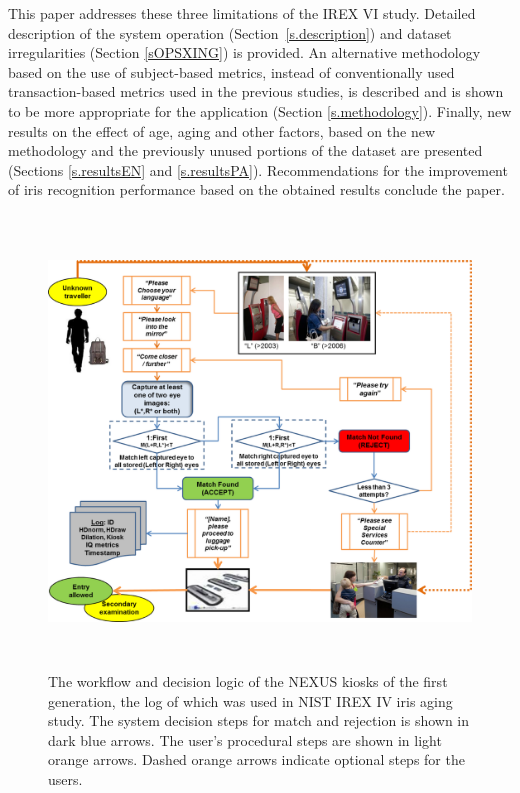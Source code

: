 \documentclass{cta-author}%
\begin{document}
This paper addresses these three limitations of the IREX VI study. 
Detailed description of the system operation (Section~\ref{s.description})
and dataset irregularities (Section \ref{sOPSXING}) is provided.
An alternative methodology based on the use of subject-based metrics, instead of conventionally used transaction-based metrics used in the previous studies,
is described and is shown to be more appropriate for the application 
(Section \ref{s.methodology}).
Finally, new results on the effect of age, aging and other factors, based on the new methodology and the previously unused portions of the dataset are presented (Sections \ref{s.resultsEN} and \ref{s.resultsPA}). 
Recommendations for the improvement of iris recognition performance based on the obtained results  conclude the paper. 



\begin{figure}[!t]
\centering
\includegraphics[width=14.5cm,height=12cm]{eps/nexus-workflow-new.eps} 
\caption{The workflow and decision logic of the NEXUS kiosks of the first generation, the log of which was used in NIST IREX IV iris aging study.  The system decision steps for match and rejection 
is shown in dark blue arrows.  The user's procedural steps are shown in light orange arrows. Dashed orange arrows indicate optional steps for the users. 
\label{f.workflow}}
\end{figure}
\end{document}
